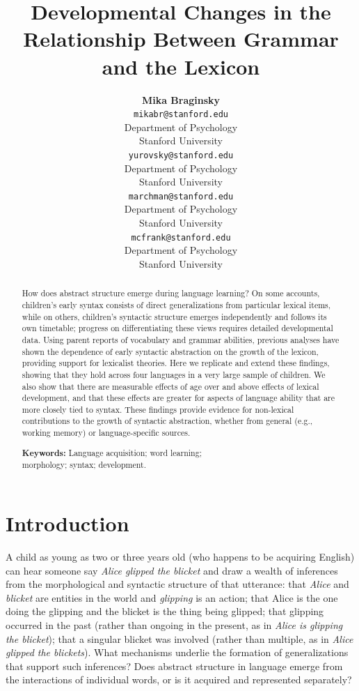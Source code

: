 \documentclass[10pt,letterpaper]{article}
\title{Developmental Changes in the Relationship Between Grammar and the Lexicon}
\author{{\large \bf Mika Braginsky} \\
  \texttt{mikabr@stanford.edu} \\
  Department of Psychology \\
  Stanford University
  \And {\large \bf Daniel Yurovsky} \\
  \texttt{yurovsky@stanford.edu} \\
  Department of Psychology \\
  Stanford University
    \And {\large \bf Virginia A. Marchman} \\
    \texttt{marchman@stanford.edu} \\
  Department of Psychology \\
  Stanford University
    \And {\large \bf Michael C. Frank}\\
    \texttt{mcfrank@stanford.edu} \\
  Department of Psychology \\
  Stanford University}
\begin{document}
\maketitle

\begin{abstract}

How does abstract structure emerge during language learning? On some accounts, children's early syntax consists of direct generalizations from particular lexical items, while on others, children's syntactic structure emerges independently and follows its own timetable; progress on differentiating these views requires detailed developmental data. Using parent reports of vocabulary and grammar abilities, previous analyses have shown the dependence of early syntactic abstraction on the growth of the lexicon, providing support for lexicalist theories. Here we replicate and extend these findings, showing that they hold across four languages in a very large sample of children. We also show that there are measurable effects of age over and above effects of lexical development, and that these effects are greater for aspects of language ability that are more closely tied to syntax. These findings provide evidence for non-lexical contributions to the growth of syntactic abstraction, whether from general (e.g., working memory) or language-specific sources.

\textbf{Keywords:} 
Language acquisition; word learning; \\morphology; syntax; development.
\end{abstract}

\section{Introduction}

A child as young as two or three years old (who happens to be acquiring English) can hear someone say \emph{Alice glipped the blicket} and draw a wealth of inferences from the morphological and syntactic structure of that utterance: that \emph{Alice} and \emph{blicket} are entities in the world and \emph{glipping} is an action; that Alice is the one doing the glipping and the blicket is the thing being glipped; that glipping occurred in the past (rather than ongoing in the present, as in \emph{Alice is glipping the blicket}); that a singular blicket was involved (rather than multiple, as in \emph{Alice glipped the blickets}). What mechanisms underlie the formation of generalizations that support such inferences? Does abstract structure in language emerge from the interactions of individual words, or is it acquired and represented separately?
\end{document}

